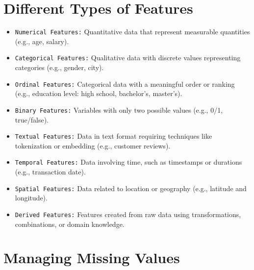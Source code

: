 \documentclass[serif, aspectratio=169]{beamer}
\begin{document}
\section{Different Types of Features}

\begin{frame}
    \begin{itemize}
        \item \texttt{\color{red}Numerical Features:} Quantitative data that represent measurable quantities (e.g., age, salary).
        \item \texttt{\color{red}Categorical Features:} Qualitative data with discrete values representing categories (e.g., gender, city).
        \item \texttt{\color{red}Ordinal Features:} Categorical data with a meaningful order or ranking (e.g., education level: high school, bachelor's, master's).
        \item \texttt{\color{red}Binary Features:} Variables with only two possible values (e.g., 0/1, true/false).
  \end{itemize}

\end{frame}

\begin{frame}
    \begin{itemize}
        \item \texttt{\color{red}Textual Features:} Data in text format requiring techniques like tokenization or embedding (e.g., customer reviews).
        \item \texttt{\color{red}Temporal Features:} Data involving time, such as timestamps or durations (e.g., transaction date).
        \item \texttt{\color{red}Spatial Features:} Data related to location or geography (e.g., latitude and longitude).
        \item \texttt{\color{red}Derived Features:} Features created from raw data using transformations, combinations, or domain knowledge.
    \end{itemize}
\end{frame}

\section{Managing Missing Values}
\end{document}
